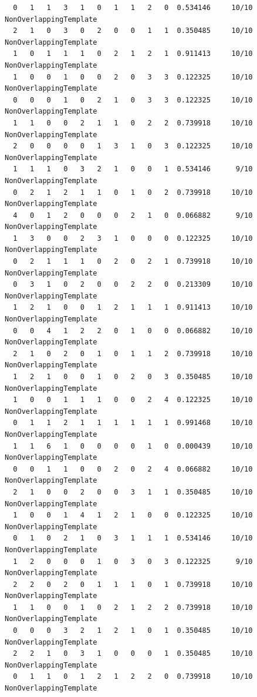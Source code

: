 \documentclass[12pt, titlepage]{report}
\theoremstyle{definition}
\begin{document}
\begin{verbatim}
  0   1   1   3   1   0   1   1   2   0  0.534146     10/10      NonOverlappingTemplate
  2   1   0   3   0   2   0   0   1   1  0.350485     10/10      NonOverlappingTemplate
  1   0   1   1   1   0   2   1   2   1  0.911413     10/10      NonOverlappingTemplate
  1   0   0   1   0   0   2   0   3   3  0.122325     10/10      NonOverlappingTemplate
  0   0   0   1   0   2   1   0   3   3  0.122325     10/10      NonOverlappingTemplate
  1   1   0   0   2   1   1   0   2   2  0.739918     10/10      NonOverlappingTemplate
  2   0   0   0   0   1   3   1   0   3  0.122325     10/10      NonOverlappingTemplate
  1   1   1   0   3   2   1   0   0   1  0.534146      9/10      NonOverlappingTemplate
  0   2   1   2   1   1   0   1   0   2  0.739918     10/10      NonOverlappingTemplate
  4   0   1   2   0   0   0   2   1   0  0.066882      9/10      NonOverlappingTemplate
  1   3   0   0   2   3   1   0   0   0  0.122325     10/10      NonOverlappingTemplate
  0   2   1   1   1   0   2   0   2   1  0.739918     10/10      NonOverlappingTemplate
  0   3   1   0   2   0   0   2   2   0  0.213309     10/10      NonOverlappingTemplate
  1   2   1   0   0   1   2   1   1   1  0.911413     10/10      NonOverlappingTemplate
  0   0   4   1   2   2   0   1   0   0  0.066882     10/10      NonOverlappingTemplate
  2   1   0   2   0   1   0   1   1   2  0.739918     10/10      NonOverlappingTemplate
  1   2   1   0   0   1   0   2   0   3  0.350485     10/10      NonOverlappingTemplate
  1   0   0   1   1   1   0   0   2   4  0.122325     10/10      NonOverlappingTemplate
  0   1   1   2   1   1   1   1   1   1  0.991468     10/10      NonOverlappingTemplate
  1   1   6   1   0   0   0   0   1   0  0.000439     10/10      NonOverlappingTemplate
  0   0   1   1   0   0   2   0   2   4  0.066882     10/10      NonOverlappingTemplate
  2   1   0   0   2   0   0   3   1   1  0.350485     10/10      NonOverlappingTemplate
  1   0   0   1   4   1   2   1   0   0  0.122325     10/10      NonOverlappingTemplate
  0   1   0   2   1   0   3   1   1   1  0.534146     10/10      NonOverlappingTemplate
  1   2   0   0   0   1   0   3   0   3  0.122325      9/10      NonOverlappingTemplate
  2   2   0   2   0   1   1   1   0   1  0.739918     10/10      NonOverlappingTemplate
  1   1   0   0   1   0   2   1   2   2  0.739918     10/10      NonOverlappingTemplate
  0   0   0   3   2   1   2   1   0   1  0.350485     10/10      NonOverlappingTemplate
  2   2   1   0   3   1   0   0   0   1  0.350485     10/10      NonOverlappingTemplate
  0   1   1   0   1   2   1   2   2   0  0.739918     10/10      NonOverlappingTemplate

\end{verbatim}
\end{document}
